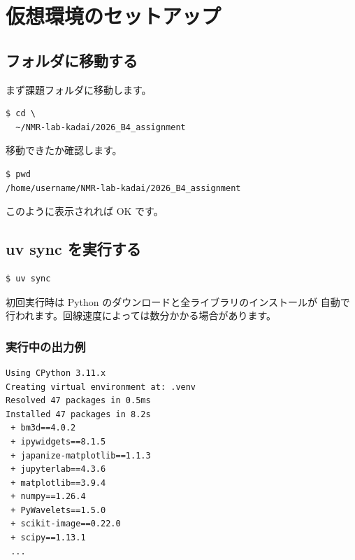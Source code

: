 \chapter{仮想環境のセットアップ}

\section{フォルダに移動する}

まず課題フォルダに移動します。

\begin{wslbox}[課題フォルダへ移動]
\begin{lstlisting}[style=bash]
$ cd \
  ~/NMR-lab-kadai/2026_B4_assignment
\end{lstlisting}
\end{wslbox}

移動できたか確認します。

\begin{wslbox}[現在地の確認]
\begin{lstlisting}[style=bash]
$ pwd
/home/username/NMR-lab-kadai/2026_B4_assignment
\end{lstlisting}
\end{wslbox}

このように表示されれば OK です。

\section{uv sync を実行する}

\begin{wslbox}[仮想環境のセットアップ]
\begin{lstlisting}[style=bash]
$ uv sync
\end{lstlisting}
\end{wslbox}

初回実行時は Python のダウンロードと全ライブラリのインストールが
自動で行われます。回線速度によっては数分かかる場合があります。

\subsection{実行中の出力例}

\begin{wslbox}
\begin{lstlisting}[style=bash]
Using CPython 3.11.x
Creating virtual environment at: .venv
Resolved 47 packages in 0.5ms
Installed 47 packages in 8.2s
 + bm3d==4.0.2
 + ipywidgets==8.1.5
 + japanize-matplotlib==1.1.3
 + jupyterlab==4.3.6
 + matplotlib==3.9.4
 + numpy==1.26.4
 + PyWavelets==1.5.0
 + scikit-image==0.22.0
 + scipy==1.13.1
 ...
\end{lstlisting}
\end{wslbox}

